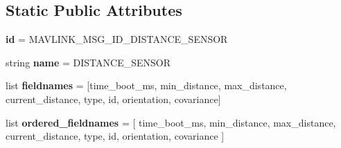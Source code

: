 \subsection*{Static Public Attributes}
\begin{DoxyCompactItemize}
\item 
\mbox{\label{classpymavlink_1_1dialects_1_1v10_1_1MAVLink__distance__sensor__message_ad2e1f3cb9e5b71c5fe759ed56de5ad7f}} 
{\bfseries id} = M\+A\+V\+L\+I\+N\+K\+\_\+\+M\+S\+G\+\_\+\+I\+D\+\_\+\+D\+I\+S\+T\+A\+N\+C\+E\+\_\+\+S\+E\+N\+S\+OR
\item 
\mbox{\label{classpymavlink_1_1dialects_1_1v10_1_1MAVLink__distance__sensor__message_a8abc7e8f005e5c79703ac4437a889e1f}} 
string {\bfseries name} = \textquotesingle{}D\+I\+S\+T\+A\+N\+C\+E\+\_\+\+S\+E\+N\+S\+OR\textquotesingle{}
\item 
\mbox{\label{classpymavlink_1_1dialects_1_1v10_1_1MAVLink__distance__sensor__message_a3a1e488c0ff5b6c3d01163d2f227d133}} 
list {\bfseries fieldnames} = \mbox{[}\textquotesingle{}time\+\_\+boot\+\_\+ms\textquotesingle{}, \textquotesingle{}min\+\_\+distance\textquotesingle{}, \textquotesingle{}max\+\_\+distance\textquotesingle{}, \textquotesingle{}current\+\_\+distance\textquotesingle{}, \textquotesingle{}type\textquotesingle{}, \textquotesingle{}id\textquotesingle{}, \textquotesingle{}orientation\textquotesingle{}, \textquotesingle{}covariance\textquotesingle{}\mbox{]}
\item 
\mbox{\label{classpymavlink_1_1dialects_1_1v10_1_1MAVLink__distance__sensor__message_a9b6e5a11b4d1ccea67e93c2d4a962449}} 
list {\bfseries ordered\+\_\+fieldnames} = \mbox{[} \textquotesingle{}time\+\_\+boot\+\_\+ms\textquotesingle{}, \textquotesingle{}min\+\_\+distance\textquotesingle{}, \textquotesingle{}max\+\_\+distance\textquotesingle{}, \textquotesingle{}current\+\_\+distance\textquotesingle{}, \textquotesingle{}type\textquotesingle{}, \textquotesingle{}id\textquotesingle{}, \textquotesingle{}orientation\textquotesingle{}, \textquotesingle{}covariance\textquotesingle{} \mbox{]}
\item 

\end{DoxyCompactItemize}
